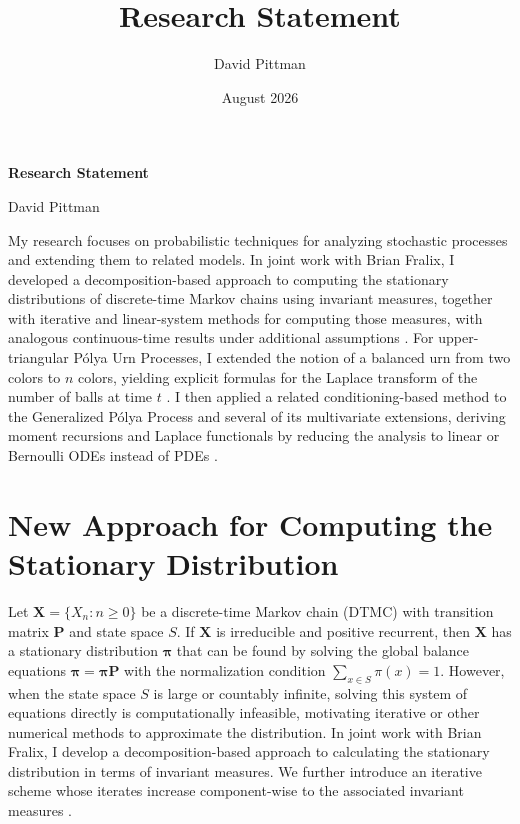 \documentclass[11pt]{article}
\title{Research Statement}
\author{David Pittman}
\date{August 2026}
\newenvironment{changemargin}[2]{%
\begin{list}{}{%
\setlength{\topsep}{0pt}%
\setlength{\leftmargin}{#1}%
\setlength{\rightmargin}{#2}%
\setlength{\listparindent}{\parindent}%
\setlength{\itemindent}{\parindent}%
\setlength{\parsep}{\parskip}%
}%
\item[]}{\end{list}}
\begin{document}
\begin{center} 
{\LARGE \textbf{Research Statement}}

\vspace{1em}

David Pittman
\end{center}

\begin{changemargin}{-0.5cm}{-0.5cm}
My research focuses on probabilistic techniques for analyzing stochastic processes and extending them to related models.
In joint work with Brian Fralix, I developed a decomposition-based approach to computing the stationary distributions of discrete-time Markov chains using invariant measures, together with iterative and linear-system methods for computing those measures, with analogous continuous-time results under additional assumptions \cite{PittmanFralix2024}.
For upper-triangular P\'{o}lya Urn Processes, I extended the notion of a balanced urn from two colors to $n$ colors, yielding explicit formulas for the Laplace transform of the number of balls at time $t$ \cite{PittmanFralix2026Polya}. 
I then applied a related conditioning-based method to the Generalized P\'{o}lya Process and several of its multivariate extensions, deriving moment recursions and Laplace functionals by reducing the analysis to linear or Bernoulli ODEs instead of PDEs \cite{PittmanFralix2026GPP}.

\section*{New Approach for Computing the Stationary Distribution}

Let $\mathbf{X}=\{X_n : n \ge 0\}$ be a discrete-time Markov chain (DTMC) with transition matrix $\mathbf{P}$ and state space $S$. If $\mathbf{X}$ is irreducible and positive recurrent, then $\mathbf{X}$ has a stationary distribution $\boldsymbol{\pi}$ that can be found by solving the global balance equations $\boldsymbol{\pi} = \boldsymbol{\pi}\mathbf{P}$ with the normalization condition $\sum_{x \in S}\pi(x)=1$. However, when the state space $S$ is large or countably infinite, solving this system of equations directly is computationally infeasible, motivating iterative or other numerical methods to approximate the distribution. In joint work with Brian Fralix, I develop a decomposition-based approach to calculating the stationary distribution in terms of invariant measures. We further introduce an iterative scheme whose iterates increase component-wise to the associated invariant measures \cite{PittmanFralix2024}.


\end{changemargin}
\end{document}
